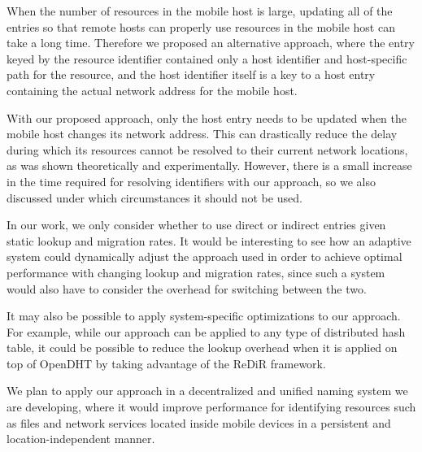 \documentclass{article}
\begin{document}
When the number of resources in the mobile host is large, updating all
of the entries so that remote hosts can properly use resources in the
mobile host can take a long time.  Therefore we proposed an
alternative approach, where the entry keyed by the resource identifier
contained only a host identifier and host-specific path for the
resource, and the host identifier itself is a key to a host entry
containing the actual network address for the mobile host.

With our proposed approach, only the host entry needs to be updated
when the mobile host changes its network address.  This can
drastically reduce the delay during which its resources cannot be
resolved to their current network locations, as was shown
theoretically and experimentally.  However, there is a small increase
in the time required for resolving identifiers with our approach, so
we also discussed under which circumstances it should not be used.

In our work, we only consider whether to use direct or indirect
entries given static lookup and migration rates.  It would be
interesting to see how an adaptive system could dynamically adjust the
approach used in order to achieve optimal performance with changing
lookup and migration rates, since such a system would also have to
consider the overhead for switching between the two.

It may also be possible to apply system-specific optimizations to our
approach.  For example, while our approach can be applied to any type
of distributed hash table, it could be possible to reduce the lookup
overhead when it is applied on top of OpenDHT by taking advantage of
the ReDiR framework.

We plan to apply our approach in a decentralized and unified naming
system we are developing, where it would improve performance for
identifying resources such as files and network services located
inside mobile devices in a persistent and location-independent manner.




\end{document}
